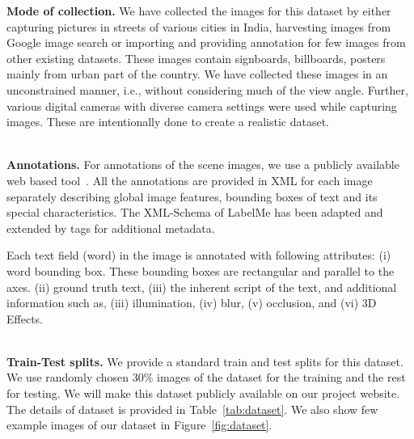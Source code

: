 \noindent\textbf{Mode of collection.} We have collected the images for this dataset by either capturing pictures in streets of various cities in India, harvesting images from Google image search or importing and providing annotation for few images from other existing datasets. These images contain signboards, billboards, posters mainly from urban part of the country. We have collected these images in an unconstrained manner, i.e., without considering much of the view angle. Further, various digital cameras with diverse camera settings were used while capturing images. These are intentionally done to create a realistic dataset.
\\
\


\noindent\textbf{Annotations.} 
For annotations of the scene images, we use a publicly available web based tool~\cite{labelme}. All the annotations are provided in XML for each image separately describing global image features, bounding boxes of text and its special characteristics. The XML-Schema of LabelMe has been adapted and extended by tags for additional metadata. 

Each text field (word) in the image is annotated with following attributes: (i) word bounding box. These bounding boxes are rectangular and parallel to the axes. (ii) ground truth text, (iii) the inherent script of the text, and additional information such as, (iii) illumination, (iv) blur, (v) occlusion, and (vi) 3D Effects. 
\\
\


\noindent\textbf{Train-Test splits.}
We provide a standard train and test splits for this dataset. We use randomly chosen 30\% images of the dataset for the training and the rest for testing. We will make this dataset publicly available on our project website. The details of dataset is provided in Table~\ref{tab:dataset}. We also show few example images of our dataset in Figure~\ref{fig:dataset}. 





 
